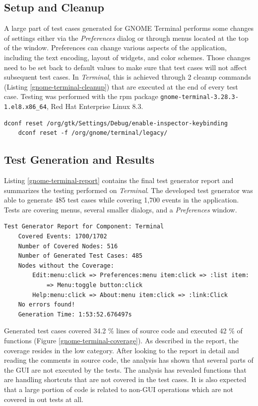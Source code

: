 \subsection{Setup and Cleanup}
A large part of test cases generated for GNOME Terminal performs some changes of settings either via the \textit{Preferences} dialog or through menus located at the top of the window. Preferences can change various aspects of the application, including the text encoding, layout of widgets, and color schemes. Those changes need to be set back to default values to make sure that test cases will not affect subsequent test cases. In \textit{Terminal}, this is achieved through 2 cleanup commands (Listing \ref{gnome-terminal-cleanup}) that are executed at the end of every test case. Testing was performed with the rpm package \texttt{gnome-terminal-3.28.3-1.el8.x86\_64}, Red Hat Enterprise Linux 8.3.

\begin{lstlisting}[caption={The cleanup commands required to reset GNOME Terminal to the default settings},label={gnome-terminal-cleanup}]
    dconf reset /org/gtk/Settings/Debug/enable-inspector-keybinding
    dconf reset -f /org/gnome/terminal/legacy/
\end{lstlisting}

\subsection{Test Generation and Results}
Listing \ref{gnome-terminal-report} contains the final test generator report and summarizes the testing performed on \textit{Terminal}. The developed test generator was able to generate 485 test cases while covering 1,700 events in the application. Tests are covering menus, several smaller dialogs, and a \textit{Preferences} window.

\begin{lstlisting}[caption={Final test generator report for GNOME Terminal},label={gnome-terminal-report}]
    Test Generator Report for Component: Terminal
    Covered Events: 1700/1702
    Number of Covered Nodes: 516
    Number of Generated Test Cases: 485 
    Nodes without the Coverage:
        Edit:menu:click => Preferences:menu item:click => :list item: 
            => Menu:toggle button:click
        Help:menu:click => About:menu item:click => :link:Click
    No errors found!
    Generation Time: 1:53:52.676497s
\end{lstlisting}

Generated test cases covered 34.2 \% lines of source code and executed 42 \% of functions (Figure \ref{gnome-terminal-coverage}). As described in the report, the coverage resides in the low category. After looking to the report in detail and reading the comments in source code, the analysis has shown that several parts of the GUI are not executed by the tests. The analysis has revealed functions that are handling shortcuts that are not covered in the test cases. It is also expected that a large portion of code is related to non-GUI operations which are not covered in out tests at all.


